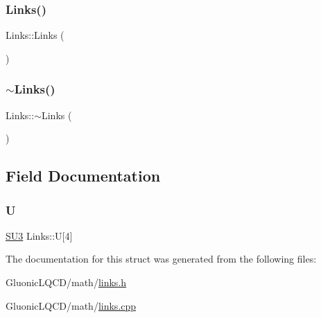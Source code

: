 \subsubsection{\texorpdfstring{Links()}{Links()}}
{\footnotesize\ttfamily Links\+::\+Links (\begin{DoxyParamCaption}{ }\end{DoxyParamCaption})}

\mbox{\label{struct_links_a188a8ccdc7df378264d24ee5b406e0af}} 
\subsubsection{\texorpdfstring{$\sim$Links()}{~Links()}}
{\footnotesize\ttfamily Links\+::$\sim$\+Links (\begin{DoxyParamCaption}{ }\end{DoxyParamCaption})}



\subsection{Field Documentation}
\mbox{\label{struct_links_a6a8574ec1ab055c455104e6c92b2f603}} 
\subsubsection{\texorpdfstring{U}{U}}
{\footnotesize\ttfamily \mbox{\hyperlink{class_s_u3}{S\+U3}} Links\+::U\mbox{[}4\mbox{]}}



The documentation for this struct was generated from the following files\+:\begin{DoxyCompactItemize}
\item 
Gluonic\+L\+Q\+C\+D/math/\mbox{\hyperlink{links_8h}{links.\+h}}\item 
Gluonic\+L\+Q\+C\+D/math/\mbox{\hyperlink{links_8cpp}{links.\+cpp}}\end{DoxyCompactItemize}
